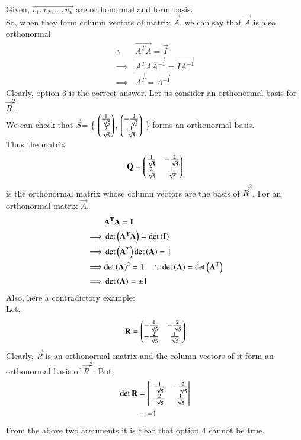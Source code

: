 Given, $\vec {v_1, v_2,..., v_n}$ are orthonormal and form basis.\\
So, when they form column vectors of matrix $\vec A $, we can say that $\vec A$ is also orthonormal.
\begin{align}
    \therefore \quad & \vec {A^T A} =\vec I\\
    \implies & \vec{A^T A A^{-1}}= \vec {I A^{-1}}\\
    \implies & \vec {A^T} = \vec {A^{-1}}
\end{align}
Clearly, option 3 is the correct answer.
Let us consider an orthonormal basis for $\vec R^2$.\\[1em]
We can check that $\vec S$= \{ $\begin{pmatrix}\frac{1}{\sqrt{5}}\\ \frac{2}{\sqrt{5}}\end{pmatrix}$, $\begin{pmatrix}-\frac{2}{\sqrt{5}}\\ \frac{1}{\sqrt{5}}\end{pmatrix}$ \} forms an orthonormal basis.\\
Thus the matrix
\begin{align}
    \mathbf Q = \begin{pmatrix}\frac{1}{\sqrt{5}} & -\frac{2}{\sqrt{5}}\\ \frac{2}{\sqrt{5}} & \frac{1}{\sqrt{5}} \end{pmatrix}
\end{align}
is the orthonormal matrix whose column vectors are the basis of $\vec R^2$.
For an orthonormal matrix $\vec A$,
\begin{align}
    & \mathbf{A^TA} =\mathbf I\\
    \implies &\det \left(\mathbf{A^TA}\right)=\det\left( \mathbf I\right)\\
    \implies & \det \left(\mathbf A^T\right) \det\left(\mathbf A\right)= 1\\
    \implies & {\det\left(\mathbf A\right)}^2 = 1 \quad \because \det\left(\mathbf A\right)= \det\left(\mathbf{A^T}\right)\\
    \implies & \det\left(\mathbf A\right) =\pm 1
\end{align}
Also, here a contradictory example:\\
Let,
\begin{align}
    \mathbf R = \begin{pmatrix}-\frac{1}{\sqrt{5}} & -\frac{2}{\sqrt{5}}\\ -\frac{2}{\sqrt{5}} & \frac{1}{\sqrt{5}}\end{pmatrix}
\end{align}
Clearly, $\vec R$  is an orthonormal matrix and the column vectors of it form an orthonormal basis of $\vec R^2$.
But,
\begin{align}
    \det {\mathbf R} &= \begin{vmatrix}-\frac{1}{\sqrt{5}} & -\frac{2}{\sqrt{5}}\\ -\frac{2}{\sqrt{5}} & \frac{1}{\sqrt{5}}\end{vmatrix}\\
    &= -1
\end{align}
From the above two arguments it is clear that option 4 cannot be true.
